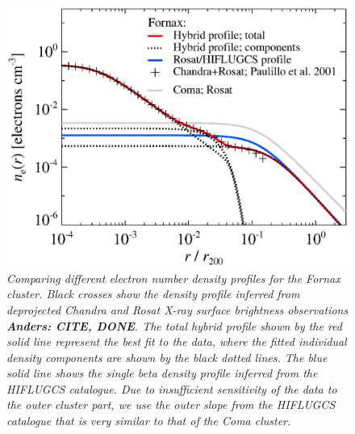 \documentclass[10pt,aps,pra,reprint,amsmath,amsfonts,amssymb,showpacs,nofootinbib,floatfix]{revtex4-1}
\begin{document}
\begin{figure}%
 \includegraphics[width=0.99\columnwidth]{figures/dens.fornax.eps}
 \caption{\it Comparing different electron number density profiles for
   the Fornax cluster. Black crosses show the density profile inferred
   from deprojected Chandra and Rosat X-ray surface brightness
   observations \cite{2002ApJ...565..883P} {\bf Anders: CITE, DONE}. The
   total hybrid profile shown by the red solid line represent the best
   fit to the data, where the fitted individual density components are
   shown by the black dotted lines. The blue solid line shows the
   single beta density profile inferred from the HIFLUGCS
   catalogue. Due to insufficient sensitivity of the data to the outer
   cluster part, we use the outer slope from the HIFLUGCS catalogue
   that is very similar to that of the Coma cluster.}
 \label{fig:dens_fornax}
\end{figure}
\end{document}
